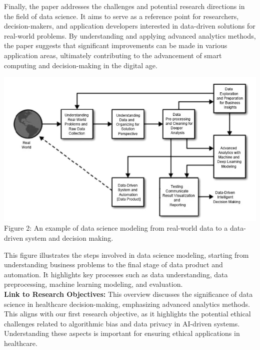 \documentclass[a4paper, 12pt]{article}
\begin{document}
Finally, the paper addresses the challenges and potential research directions in the field of data science. It aims to serve as a reference point for researchers, decision-makers, and application developers interested in data-driven solutions for real-world problems. By understanding and applying advanced analytics methods, the paper suggests that significant improvements can be made in various application areas, ultimately contributing to the advancement of smart computing and decision-making in the digital age.

\begin{center}
\includegraphics[scale=0.7]{Figure2.png}\\
\small Figure 2: An example of data science modeling from real-world data to a data-driven system and decision making. \normalsize
\end{center}

This figure illustrates the steps involved in data science modeling, starting from understanding business problems to the final stage of data product and automation. It highlights key processes such as data understanding, data preprocessing, machine learning modeling, and evaluation. \\

\textbf{Link to Research Objectives:} This overview discusses the significance of data science in healthcare decision-making, emphasizing advanced analytics methods. This aligns with our first research objective, as it highlights the potential ethical challenges related to algorithmic bias and data privacy in AI-driven systems. Understanding these aspects is important for ensuring ethical applications in healthcare.
\end{document}
